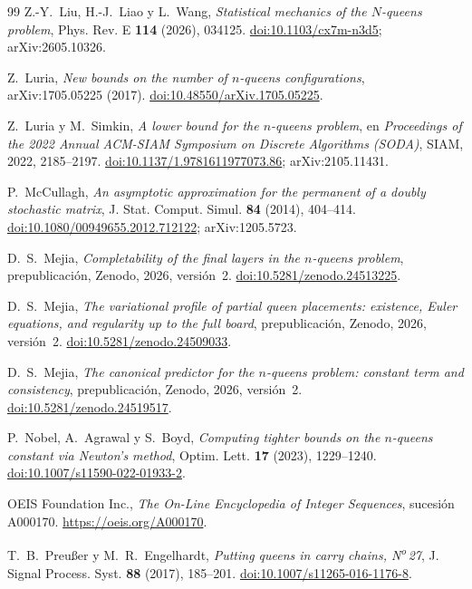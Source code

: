 \begin{thebibliography}{99}
 Z.-Y.~Liu, H.-J.~Liao y L.~Wang, \emph{Statistical mechanics of the $N$-queens problem},
Phys. Rev. E \textbf{114} (2026), 034125.
\href{https://doi.org/10.1103/cx7m-n3d5}{doi:10.1103/cx7m-n3d5}; arXiv:2605.10326.

 Z.~Luria, \emph{New bounds on the number of $n$-queens configurations},
arXiv:1705.05225 (2017).
\href{https://doi.org/10.48550/arXiv.1705.05225}{doi:10.48550/arXiv.1705.05225}.

 Z.~Luria y M.~Simkin, \emph{A lower bound for the $n$-queens problem}, en
\emph{Proceedings of the 2022 Annual ACM-SIAM Symposium on Discrete Algorithms (SODA)}, SIAM, 2022,
2185--2197.
\href{https://doi.org/10.1137/1.9781611977073.86}{doi:10.1137/1.9781611977073.86};
arXiv:2105.11431.

 P.~McCullagh, \emph{An asymptotic approximation for the permanent of a doubly
stochastic matrix}, J. Stat. Comput. Simul. \textbf{84} (2014), 404--414.
\href{https://doi.org/10.1080/00949655.2012.712122}{doi:10.1080/00949655.2012.712122};
arXiv:1205.5723.

 D.~S.~Mejia, \emph{Completability of the final layers in the $n$-queens problem},
prepublicación, Zenodo, 2026, versión~2.
\href{https://doi.org/10.5281/zenodo.24513225}{doi:10.5281/zenodo.24513225}.

 D.~S.~Mejia, \emph{The variational profile of partial queen placements: existence,
Euler equations, and regularity up to the full board}, prepublicación, Zenodo, 2026, versión~2.
\href{https://doi.org/10.5281/zenodo.24509033}{doi:10.5281/zenodo.24509033}.

 D.~S.~Mejia, \emph{The canonical predictor for the $n$-queens problem: constant term
and consistency}, prepublicación, Zenodo, 2026, versión~2.
\href{https://doi.org/10.5281/zenodo.24519517}{doi:10.5281/zenodo.24519517}.

 P.~Nobel, A.~Agrawal y S.~Boyd, \emph{Computing tighter bounds on the $n$-queens
constant via Newton's method}, Optim. Lett. \textbf{17} (2023), 1229--1240.
\href{https://doi.org/10.1007/s11590-022-01933-2}{doi:10.1007/s11590-022-01933-2}.

 OEIS Foundation Inc., \emph{The On-Line Encyclopedia of Integer Sequences},
sucesión A000170. \url{https://oeis.org/A000170}.

 T.~B.~Preußer y M.~R.~Engelhardt, \emph{Putting queens in carry chains,
N\textsuperscript{o}\,27}, J. Signal Process. Syst. \textbf{88} (2017), 185--201.
\href{https://doi.org/10.1007/s11265-016-1176-8}{doi:10.1007/s11265-016-1176-8}.


\end{thebibliography}
